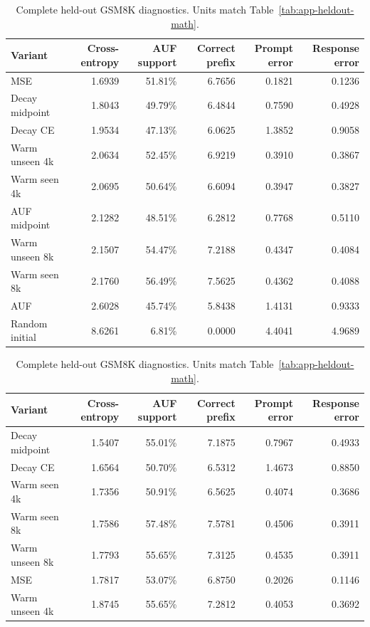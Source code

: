 \begin{table}[htbp]
\centering
\caption{Complete held-out MATH diagnostics. Cross-entropy is in nats/token, AUF support is a percentage, correct prefix is in tokens, and context errors are dimensionless.}
\label{tab:app-heldout-math}
\scriptsize
\begin{tabular}{lrrrrr}
\toprule
Variant & Cross-entropy & AUF support & Correct prefix & Prompt error & Response error \\
\midrule
MSE & 1.6939 & 51.81\% & 6.7656 & 0.1821 & 0.1236 \\
Decay midpoint & 1.8043 & 49.79\% & 6.4844 & 0.7590 & 0.4928 \\
Decay CE & 1.9534 & 47.13\% & 6.0625 & 1.3852 & 0.9058 \\
Warm unseen 4k & 2.0634 & 52.45\% & 6.9219 & 0.3910 & 0.3867 \\
Warm seen 4k & 2.0695 & 50.64\% & 6.6094 & 0.3947 & 0.3827 \\
AUF midpoint & 2.1282 & 48.51\% & 6.2812 & 0.7768 & 0.5110 \\
Warm unseen 8k & 2.1507 & 54.47\% & 7.2188 & 0.4347 & 0.4084 \\
Warm seen 8k & 2.1760 & 56.49\% & 7.5625 & 0.4362 & 0.4088 \\
AUF & 2.6028 & 45.74\% & 5.8438 & 1.4131 & 0.9333 \\
Random initial & 8.6261 & 6.81\% & 0.0000 & 4.4041 & 4.9689 \\
\bottomrule
\end{tabular}
\par\medskip
\caption{Complete held-out GSM8K diagnostics. Units match Table~\ref{tab:app-heldout-math}.}
\label{tab:app-heldout-gsm}
\begin{tabular}{lrrrrr}
\toprule
Variant & Cross-entropy & AUF support & Correct prefix & Prompt error & Response error \\
\midrule
Decay midpoint & 1.5407 & 55.01\% & 7.1875 & 0.7967 & 0.4933 \\
Decay CE & 1.6564 & 50.70\% & 6.5312 & 1.4673 & 0.8850 \\
Warm seen 4k & 1.7356 & 50.91\% & 6.5625 & 0.4074 & 0.3686 \\
Warm seen 8k & 1.7586 & 57.48\% & 7.5781 & 0.4506 & 0.3911 \\
Warm unseen 8k & 1.7793 & 55.65\% & 7.3125 & 0.4535 & 0.3911 \\
MSE & 1.7817 & 53.07\% & 6.8750 & 0.2026 & 0.1146 \\
Warm unseen 4k & 1.8745 & 55.65\% & 7.2812 & 0.4053 & 0.3692 \\

\end{tabular}
\end{table}
